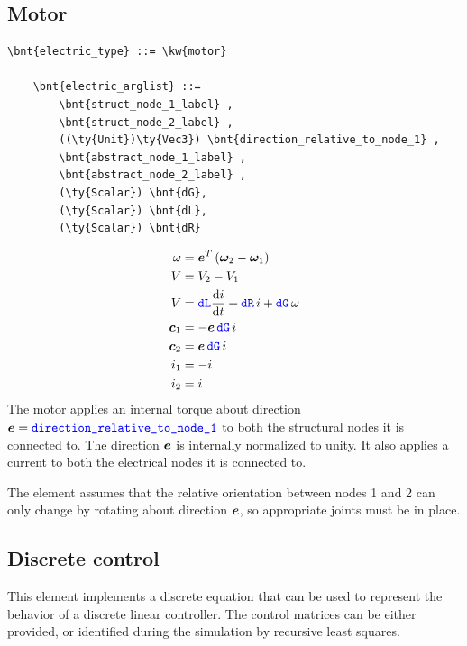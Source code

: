\subsection{Motor}
\begin{Verbatim}[commandchars=\\\{\}]
    \bnt{electric_type} ::= \kw{motor}

    \bnt{electric_arglist} ::=
        \bnt{struct_node_1_label} ,
        \bnt{struct_node_2_label} ,
        ((\ty{Unit})\ty{Vec3}) \bnt{direction_relative_to_node_1} ,
        \bnt{abstract_node_1_label} ,
        \bnt{abstract_node_2_label} ,
        (\ty{Scalar}) \bnt{dG},
        (\ty{Scalar}) \bnt{dL},
        (\ty{Scalar}) \bnt{dR}
\end{Verbatim}
\begin{subequations}
\begin{align}
	\omega &= \boldsymbol{e}^T \left( \boldsymbol{\omega}_2 - \boldsymbol{\omega}_1 \right) \\
	V &= V_2 - V_1 \\
	V &= \textcolor{blue}{\texttt{dL}} \frac{\mathrm{d}i}{\mathrm{d}t} + \textcolor{blue}{\texttt{dR}} \, i + \textcolor{blue}{\texttt{dG}} \, \omega \\
	\boldsymbol{c}_1 &= - \boldsymbol{e} \, \textcolor{blue}{\texttt{dG}} \, i \\
	\boldsymbol{c}_2 &= \boldsymbol{e} \, \textcolor{blue}{\texttt{dG}} \, i \\
	i_1 &= -i \\
	i_2 &= i
\end{align}
\end{subequations}
The motor applies an internal torque about direction
$\boldsymbol{e}=\textcolor{blue}{\texttt{direction\_relative\_to\_node\_1}}$
to both the structural nodes it is connected to.
The direction $\boldsymbol{e}$ is internally normalized to unity.
It also applies a current to both the electrical nodes it is connected to.

The element assumes that the relative orientation between nodes 1 and 2
can only change by rotating about direction $\boldsymbol{e}$, so appropriate
joints must be in place.


\subsection{Discrete control}\label{sec:EL:DISCCTRL}
This element implements a discrete equation
that can be used to represent the behavior
of a discrete linear controller.
The control matrices can be either provided,
or identified during the simulation by recursive least squares.

